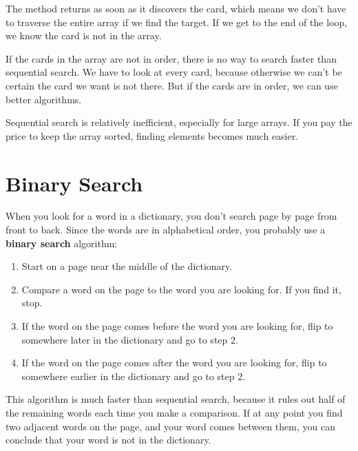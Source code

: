 
The method returns as soon as it discovers the card, which means we don't have to traverse the entire array if we find the target.
If we get to the end of the loop, we know the card is not in the array.


If the cards in the array are not in order, there is no way to search faster than sequential search.
We have to look at every card, because otherwise we can't be certain the card we want is not there.
But if the cards are in order, we can use better algorithms.

Sequential search is relatively inefficient, especially for large arrays.
If you pay the price to keep the array sorted, finding elements becomes much easier.


\section{Binary Search}



When you look for a word in a dictionary, you don't search page by page from front to back.
Since the words are in alphabetical order, you probably use a {\bf binary search} algorithm:

\begin{enumerate}

\item Start on a page near the middle of the dictionary.

\item Compare a word on the page to the word you are looking for.
If you find it, stop.

\item If the word on the page comes before the word you are looking for, flip to somewhere later in the dictionary and go to step 2.

\item If the word on the page comes after the word you are looking for, flip to somewhere earlier in the dictionary and go to step 2.

\end{enumerate}

This algorithm is much faster than sequential search, because it rules out half of the remaining words each time you make a comparison.
If at any point you find two adjacent words on the page, and your word comes between them, you can conclude that your word is not in the dictionary.

